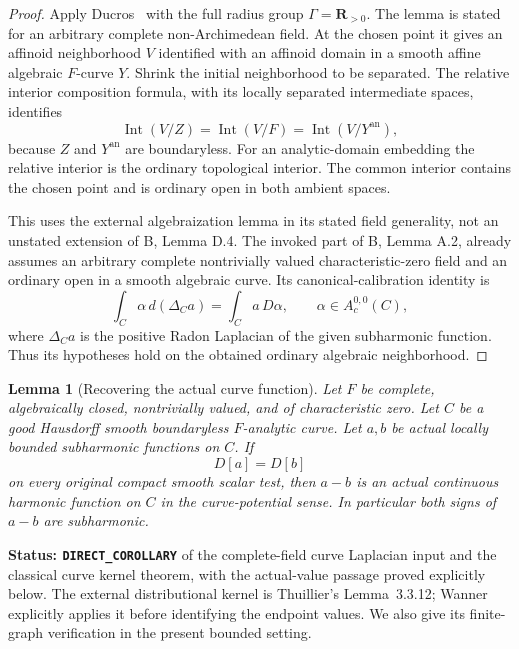 \documentclass[11pt,a4paper]{article}
\numberwithin{equation}{section}
\newtheorem{lemma}[theorem]{Lemma}
\theoremstyle{definition}
\theoremstyle{remark}
\begin{document}
\begin{proof}
Apply Ducros~\cite[Lemma~(0.21)]{Duc12} with the full radius group
$\Gamma=\mathbf R_{>0}$.  The lemma is stated for an arbitrary
complete non-Archimedean field.  At the chosen point it gives an
affinoid neighborhood $V$ identified with an affinoid domain in a
smooth affine algebraic $F$-curve $Y$.
Shrink the initial neighborhood to be separated.  The relative
interior composition formula, with its locally separated intermediate
spaces, identifies
\[
 \operatorname{Int}(V/Z)=\operatorname{Int}(V/F)
                       =\operatorname{Int}(V/Y^{\mathrm{an}}),
\]
because $Z$ and $Y^{\mathrm{an}}$ are boundaryless.
For an analytic-domain embedding the relative interior is the
ordinary topological interior.  The common interior contains the
chosen point and is ordinary open in both ambient spaces.

This uses the external algebraization lemma in its stated field
generality, not an unstated extension of B, Lemma D.4.  The invoked
part of B, Lemma A.2, already assumes an arbitrary complete
nontrivially valued characteristic-zero field and an ordinary open
in a smooth algebraic curve.  Its canonical-calibration identity is
\begin{equation}
 \int_C\alpha\,d(\Delta_C a)=\int_C a\,D\alpha,
       \qquad \alpha\in A_c^{0,0}(C),
 \label{eq:r5-curve-laplacian-compatibility}
\end{equation}
where $\Delta_C a$ is the positive Radon Laplacian of the given
subharmonic function.  Thus its hypotheses hold on the obtained
ordinary algebraic neighborhood.
\end{proof}

\begin{lemma}[Recovering the actual curve function]
\label{lem:r5-actual-curve-harmonic-representative}
Let $F$ be complete, algebraically closed, nontrivially valued, and
of characteristic zero.  Let $C$ be a good Hausdorff smooth
boundaryless $F$-analytic curve.  Let $a,b$ be actual locally bounded
subharmonic functions on $C$.  If
\[
                         D[a]=D[b]
\]
on every original compact smooth scalar test, then $a-b$ is an
actual continuous harmonic function on $C$ in the curve-potential
sense.  In particular both signs of $a-b$ are subharmonic.
\end{lemma}

\noindent\textbf{Status: \texttt{DIRECT\_COROLLARY}} of the
complete-field curve Laplacian input and the classical curve kernel
theorem, with the actual-value passage proved explicitly below.
The external distributional kernel is Thuillier's
Lemma~3.3.12; Wanner~\cite[Remark~7.2, p.~22, and Remark~7.12,
p.~27]{Wan22} explicitly applies it before identifying the endpoint
values.  We also give its finite-graph verification in the present
bounded setting.
\end{document}
